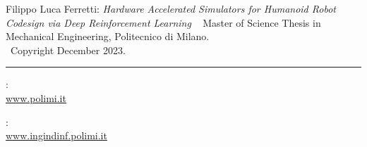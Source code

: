 \clearpage
%
%
\thispagestyle{empty}

%
%
\hfill
%
\vfill
%
\noindent Filippo Luca Ferretti:
%
\textit{Hardware Accelerated Simulators for Humanoid Robot Codesign via Deep Reinforcement Learning} \textbar\
%
Master of Science Thesis in Mechanical Engineering, Politecnico di Milano.
%
\\
%
\textcopyright ~Copyright December 2023.

\vspace{0.5cm}
\hrule
\bigskip

: \\
\href{http://polimi.it}{www.polimi.it}

\medskip
{}: \\
\href{https://www.ingindinf.polimi.it}{www.ingindinf.polimi.it}

\cleardoublepage